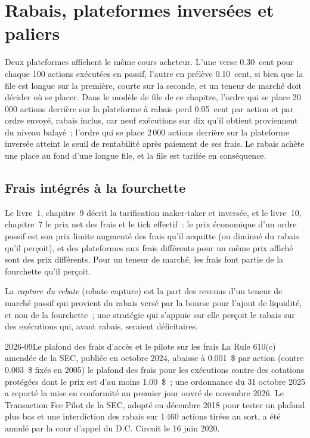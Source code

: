 \chapter{Rabais, plateformes inversées et paliers}\label{ch:hf:rebates-inverted-venues-and-tiers}

Deux plateformes affichent le même cours acheteur. L'une verse 0.30~cent pour chaque 100 actions exécutées en passif, l'autre en prélève 0.10~cent, si bien que la file est longue sur la première,
courte sur la seconde, et un teneur de marché doit décider où se placer. Dans le modèle de file de ce chapitre, l'ordre qui se place
20\,000 actions derrière sur la plateforme à rabais perd 0.05~cent par action et par ordre envoyé, rabais inclus, car neuf exécutions sur dix qu'il obtient
proviennent du niveau balayé~; l'ordre qui se place 2\,000 actions derrière sur la plateforme inversée atteint le seuil de rentabilité après paiement de ses frais. Le rabais achète une place au fond
d'une longue file, et la file est tarifée en conséquence.

\section{Frais intégrés à la fourchette}

Le livre~1, chapitre~9 décrit la tarification maker-taker et inversée, et le livre~10, chapitre~7 le prix net des frais et le tick effectif~: le
prix économique d'un ordre passif est son prix limite augmenté des frais qu'il acquitte (ou diminué du rabais qu'il perçoit), et des plateformes aux frais différents pour un même
prix affiché sont des prix différents. Pour un teneur de marché, les frais font partie de la fourchette qu'il perçoit.

\begin{definition}\label{def:hf:rebates-inverted-venues-and-tiers:capture}
La \emph{capture du rebate} (rebate capture) est la part des revenus d'un teneur de marché passif qui provient du rabais versé par la bourse pour l'ajout de liquidité, et non de la
fourchette~; une stratégie qui s'appuie sur elle perçoit le rabais sur des exécutions qui, avant rabais, seraient déficitaires.
\end{definition}

\begin{dated}{2026-09}{Le plafond des frais d'accès et le pilote sur les frais}\label{dat:hf:rebates-inverted-venues-and-tiers:cap}
La Rule 610(c) amendée de la SEC, publiée en octobre 2024, abaisse à 0.001~\$ par action (contre 0.003~\$ fixés en 2005) le plafond des frais pour les exécutions contre des cotations protégées dont le prix est d'au
moins 1.00~\$~; une ordonnance du 31 octobre 2025 a reporté la mise en conformité au premier jour ouvré de novembre
2026. Le Transaction Fee Pilot de la SEC, adopté en décembre 2018 pour tester un plafond plus bas et une interdiction des rabais sur 1\,460 actions tirées au sort, a été
annulé par la cour d'appel du D.C. Circuit le 16 juin 2020.
\end{dated}

